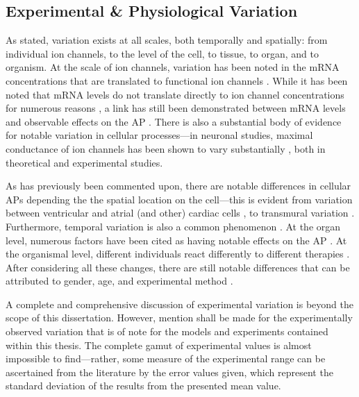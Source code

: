 \documentclass[../thesis-main.tex]{subfiles}
\begin{document}
 \subsection{Experimental \& Physiological Variation}
 \label{subsec:experimental-var}
 As stated, variation exists at all scales, both temporally and spatially: from individual ion channels, to the level of the cell, to tissue, to organ, and to organism. At the scale of ion channels, variation has been noted in the mRNA concentrations that are translated to functional ion channels \citep{Gaborit2007}. While it has been noted that mRNA levels do not translate directly to ion channel concentrations for numerous reasons \citep{Edelman2001, Nattel2010}, a link has still been demonstrated between mRNA levels and observable effects on the AP \citep{Walmsley2013}. There is also a substantial body of evidence for notable variation in cellular processes---in neuronal studies, maximal conductance of ion channels has been shown to vary substantially \citep{Marder2011, Goaillard2009, Schulz2006}, both in theoretical and experimental studies.
 
 As has previously been commented upon, there are notable differences in cellular APs depending the the spatial location on the cell---this is evident from variation between ventricular and atrial (and other) cardiac cells \citep{Carmeliet2002}, to transmural variation \citep{Antzelevitch1991}. Furthermore, temporal variation is also a common phenomenon \citep{Walmsley2010}. At the organ level, numerous factors have been cited as having notable effects on the AP \citep{Taylor1997}. At the organismal level, different individuals react differently to different therapies \citep{Kannankeril2010}. After considering all these changes, there are still notable differences that can be attributed to gender, age, and experimental method \citep{Yang2012, Kurokawa2012}.
 
 A complete and comprehensive discussion of experimental variation is beyond the scope of this dissertation. However, mention shall be made for the experimentally observed variation that is of note for the models and experiments contained within this thesis. The complete gamut of experimental values is almost impossible to find---rather, some measure of the experimental range can be ascertained from the literature by the error values given, which represent the standard deviation of the results from the presented mean value.
 
\end{document}
